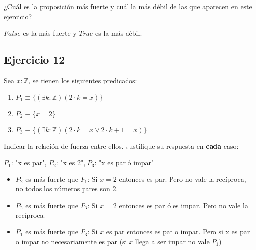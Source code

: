 \documentclass[10pt,a4paper]{article}
\begin{document}
¿Cuál es la proposición más fuerte y cuál la más débil de las que aparecen en este ejercicio?

$False$ es la más fuerte y $True$ es la más débil.

\subsection*{Ejercicio 12}
Sea $x : \mathbb{Z}$, se tienen los siguientes predicados:
\begin{enumerate}
\item $P_{1}  \equiv \{(\exists k : \mathbb{Z})(2 \cdot k = x)\}$
\item $P_{2} \equiv \{x = 2\}$
\item $P_{3} \equiv \{(\exists k : \mathbb{Z})(2 \cdot k = x \vee 2 \cdot k + 1 = x)\}$
\end{enumerate}
Indicar la relación de fuerza entre ellos. Justifique su respuesta en \textbf{cada} caso:

$P_{1}$: "x es par", $P_{2}$: "x es 2", $P_{3}$: "x es par ó impar"
\begin{itemize}
\item $P_{2}$ es más fuerte que $P_{1}$: Si $x=2$ entonces es par. Pero no vale la recíproca, no todos los números pares son 2.
\item $P_{2}$ es más fuerte que $P_{3}$: Si $x=2$ entonces es par ó es impar. Pero no vale la recíproca.
\item $P_{1}$ es más fuerte que $P_{3}$: Si $x$ es par entonces es par o impar. Pero si x es par o impar no necesariamente es par (si $x$ llega a ser impar no vale $P_{1}$)
\end{itemize}
\end{document}
